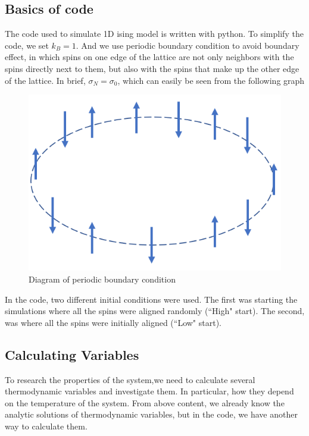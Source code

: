 \documentclass[12pt]{article}
\begin{document}
	\subsection{Basics of code}
	\label{sec； basic of code}
	The code used to simulate 1D ising model is written with python. To simplify the code, we set $k_B=1$. And we use periodic boundary condition to avoid boundary effect, in which spins on one edge of the
	lattice are not only neighbors with the spins directly next
	to them, but also with the spins that make up the other
	edge of the lattice. In brief, $\sigma_N=\sigma_0$, which can easily be seen from the following graph
	\begin{figure}[H]
		\centering
		\includegraphics[scale=0.7]{periodic condition.png}
		\caption{Diagram of periodic boundary condition}
		\label{fig: periodic condition}
	\end{figure}
	
	In the code, two different initial conditions were used. The first was starting the simulations where all the spins were aligned randomly (``High" start). The second, was where all the spins were initially aligned (``Low" start). 
	
	\subsection{Calculating Variables}
	\label{subsubsec: calculateing variables}
	To research the properties of the system,we need to calculate several thermodynamic variables and investigate them. In particular, how they depend on the temperature of the system. From above content, we already know the analytic solutions of thermodynamic variables, but in the code, we have another way to calculate them.
	
\end{document}
